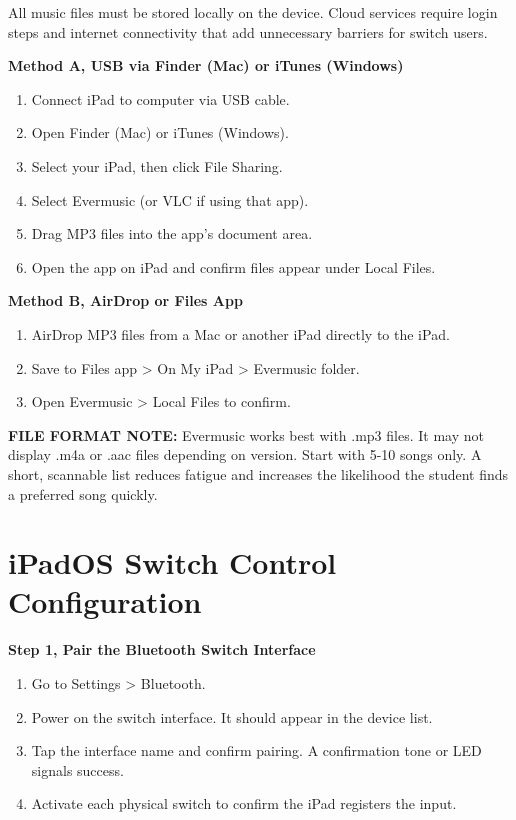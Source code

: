 \documentclass[justified,openright]{tufte-book}
\begin{document}
All music files must be stored locally on the device. Cloud services
require login steps and internet connectivity that add unnecessary
barriers for switch users.

\textbf{Method A, USB via Finder (Mac) or iTunes (Windows)}

\begin{enumerate}
\item
  Connect iPad to computer via USB cable.
\item
  Open Finder (Mac) or iTunes (Windows).
\item
  Select your iPad, then click File Sharing.
\item
  Select Evermusic (or VLC if using that app).
\item
  Drag MP3 files into the app's document area.
\item
  Open the app on iPad and confirm files appear under Local Files.
\end{enumerate}

\textbf{Method B, AirDrop or Files App}

\begin{enumerate}
\item
  AirDrop MP3 files from a Mac or another iPad directly to the iPad.
\item
  Save to Files app \textgreater{} On My iPad \textgreater{} Evermusic
  folder.
\item
  Open Evermusic \textgreater{} Local Files to confirm.
\end{enumerate}


\textbf{FILE FORMAT NOTE:} Evermusic works best with .mp3 files. It may
not display .m4a or .aac files depending on version. Start with 5-10
songs only. A short, scannable list reduces fatigue and increases the
likelihood the student finds a preferred song quickly.


\section{iPadOS Switch Control
Configuration}\label{ipados-switch-control-configuration}


\textbf{Step 1, Pair the Bluetooth Switch Interface}

\begin{enumerate}
\item
  Go to Settings \textgreater{} Bluetooth.
\item
  Power on the switch interface. It should appear in the device list.
\item
  Tap the interface name and confirm pairing. A confirmation tone or LED
  signals success.
\item
  Activate each physical switch to confirm the iPad registers the input.
\end{enumerate}
\end{document}
